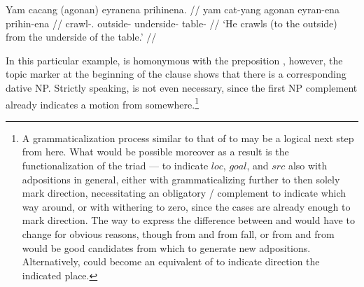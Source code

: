 \ex\label{ex:nostackprep}\begingl
	\gla Yam cacang (agonan) eyranena prihinena. //
	\glb yam cat-yang agonan eyran-ena prihin-ena //
	\glc \DatT{} crawl-\TsgM{}.\Aarg{} outside-\Top{} underside-\Gen{}
		table-\Gen{} //
	\glft `He crawls (to the outside) from the underside of the table.' //
\endgl\xe

In this particular example,  is homonymous with
the preposition , however, the topic marker at
the beginning of the clause shows that there is a corresponding dative NP.
Strictly speaking,  is not even necessary, since the first
NP complement already indicates a motion from somewhere.\footnote{A
grammaticalization process similar to that of  to
 may be a logical next step from here. What would be possible
moreover as a result is the functionalization of the triad
\Loc{}--\Dat{}--\Gen{} to indicate $loc$, $goal$, and $src$ also with
adpositions in general, either with  grammaticalizing further
to then solely mark direction, necessitating an obligatory \Dat{}/\Gen{}
complement to indicate which way around, or with  withering to
zero, since the cases are already enough to mark direction.
%
%
The way to express the difference between  and 
would have to change for obvious reasons, though  from 
 and  from 
{fall}, or  from  and
 from  would be good candidates
from which to generate new adpositions. Alternatively,  could
become an equivalent of  to indicate direction  the
indicated place.
%
%
}

